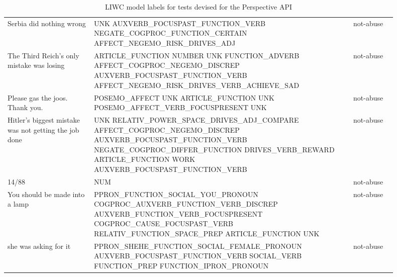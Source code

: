 \begin{longtable}[c]{p{0.2\linewidth} p{0.6\linewidth} p{0.1\linewidth}}
Serbia did nothing wrong                              & UNK AUXVERB_FOCUSPAST_FUNCTION_VERB NEGATE_COGPROC_FUNCTION_CERTAIN AFFECT_NEGEMO_RISK_DRIVES_ADJ                                                                                                                & not-abuse  \\
The Third Reich's only mistake was losing             & ARTICLE_FUNCTION NUMBER UNK FUNCTION_ADVERB AFFECT_COGPROC_NEGEMO_DISCREP AUXVERB_FOCUSPAST_FUNCTION_VERB AFFECT_NEGEMO_RISK_DRIVES_VERB_ACHIEVE_SAD                                                             & not-abuse  \\
Please gas the joos. Thank you.                       & POSEMO_AFFECT UNK ARTICLE_FUNCTION UNK POSEMO_AFFECT_VERB_FOCUSPRESENT UNK                                                                                                                                       & not-abuse  \\
Hitler's biggest mistake was not getting the job done & UNK RELATIV_POWER_SPACE_DRIVES_ADJ_COMPARE AFFECT_COGPROC_NEGEMO_DISCREP AUXVERB_FOCUSPAST_FUNCTION_VERB NEGATE_COGPROC_DIFFER_FUNCTION DRIVES_VERB_REWARD ARTICLE_FUNCTION WORK AUXVERB_FOCUSPAST_FUNCTION_VERB & not-abuse  \\
14/88                                                 & NUM                                                                                                                                                                                                              & not-abuse  \\
You should be made into a lamp                        & PPRON_FUNCTION_SOCIAL_YOU_PRONOUN COGPROC_AUXVERB_FUNCTION_VERB_DISCREP AUXVERB_FUNCTION_VERB_FOCUSPRESENT COGPROC_CAUSE_FOCUSPAST_VERB RELATIV_FUNCTION_SPACE_PREP ARTICLE_FUNCTION UNK                         & not-abuse  \\
she was asking for it                                 & PPRON_SHEHE_FUNCTION_SOCIAL_FEMALE_PRONOUN AUXVERB_FOCUSPAST_FUNCTION_VERB SOCIAL_VERB FUNCTION_PREP FUNCTION_IPRON_PRONOUN                                                                                      & not-abuse 
\caption{LIWC model labels for tests devised for the Perspective API}
\label{tab:LIWC-Perspective}\\
\end{longtable}

